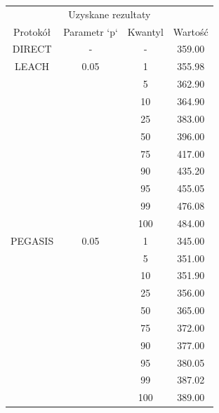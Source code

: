 \documentclass[a4paper,12pt,twoside,openany]{report}
\begin{document}
\begin{longtable}{*{4}{c}}
\toprule
\multicolumn{4}{c}{Uzyskane rezultaty} \\
Protokół	& Parametr `p`	& Kwantyl	& Wartość \\
\midrule
\endhead
DIRECT	& - 	& -	& 359.00 \\*
\midrule
LEACH	& 0.05	& 1	& 355.98 \\*
	&	& 5	& 362.90 \\*
	&	& 10	& 364.90 \\*
	&	& 25	& 383.00 \\*
	&	& 50	& 396.00 \\*
	&	& 75	& 417.00 \\*
	&	& 90	& 435.20 \\*
	&	& 95	& 455.05 \\*
	&	& 99	& 476.08 \\*
	&	& 100	& 484.00 \\*
\midrule
PEGASIS	& 0.05	& 1	& 345.00 \\*
	&	& 5	& 351.00 \\*
	&	& 10	& 351.90 \\*
	&	& 25	& 356.00 \\*
	&	& 50	& 365.00 \\*
	&	& 75	& 372.00 \\*
	&	& 90	& 377.00 \\*
	&	& 95	& 380.05 \\*
	&	& 99	& 387.02 \\*
	&	& 100	& 389.00 \\*
\bottomrule
\end{longtable}
\end{document}
